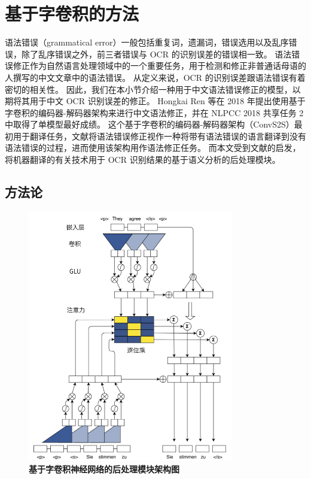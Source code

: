 \chapter{基于字卷积的方法}
\label{chap:cs2s}
语法错误（grammatical error）一般包括重复词，遗漏词，错误选用以及乱序错误，除了乱序错误之外，前三者错误与 OCR 的识别误差的错误相一致。
语法错误修正作为自然语言处理领域中的一个重要任务，用于检测和修正非普通话母语的人撰写的中文文章中的语法错误。
从定义来说，OCR 的识别误差跟语法错误有着密切的相关性。
因此，我们在本小节介绍一种用于中文语法错误修正的模型，以期将其用于中文 OCR 识别误差的修正。
Hongkai Ren 等\cite{NLPCC}在 2018 年提出使用基于字卷积的编码器-解码器架构来进行中文语法修正，并在 NLPCC 2018 共享任务 2 中取得了单模型最好成绩。
这个基于字卷积的编码器-解码器架构\cite{cs2s}（ConvS2S）最初用于翻译任务，文献\cite{NLPCC}将语法错误修正视作一种将带有语法错误的语言翻译到没有语法错误的过程，进而使用该架构用作语法修正任务。
而本文受到文献\cite{NLPCC}的启发，将机器翻译的有关技术用于 OCR 识别结果的基于语义分析的后处理模块。

\section{方法论}

\begin{figure}[h!]
	\centering
	\includegraphics[width=0.8\textwidth]{figure/resources/CS2S_arch.png}
	\caption{\textbf{基于字卷积神经网络的后处理模块架构图}\label{CS2S_arch}}
\end{figure}


